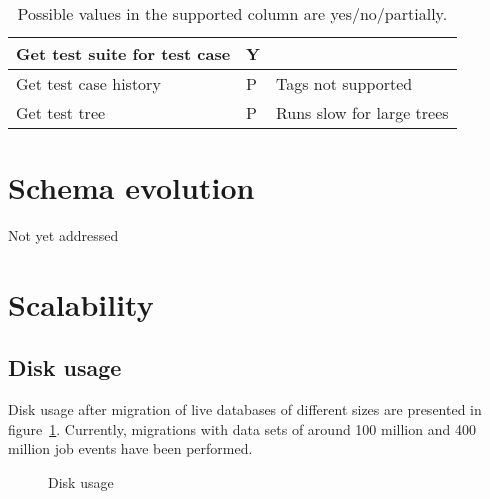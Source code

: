 \begin{table}[h]
\begin{tabular}{|l|l|l|}
Get test suite for test case                 & Y                                                                                        &                            \\ \hline
Get test case history                        & P                                                                                        & Tags not supported         \\ \hline
Get test tree                                & P                                                                                        & Runs slow for large trees  \\ \hline
\end{tabular}
\caption{Possible values in the supported column are yes/no/partially.}
\label{tab:archivequeries}
\end{table}

\section{Schema evolution}
Not yet addressed

\section{Scalability}
\subsection{Disk usage}
Disk usage after migration of live databases of different sizes are presented in figure~\ref{fig:disc}. Currently, migrations with data sets of around 100 million and 400 million job events have been performed. 
\begin{figure}[h!]
\centering
{}
\caption{Disk usage}
\label{fig:disc}
\end{figure}
